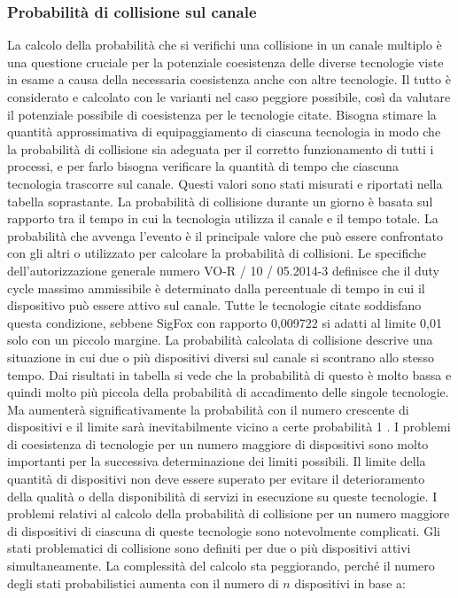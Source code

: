 \documentclass[a4paper]{report} %
\begin{document}
\subsubsection{Probabilità di collisione sul canale}
La calcolo della probabilità che si verifichi una collisione in un canale multiplo è una questione cruciale per la potenziale coesistenza delle diverse tecnologie viste in esame a causa della necessaria coesistenza anche con altre tecnologie. Il tutto è considerato e calcolato con le varianti nel caso peggiore possibile, così da valutare il potenziale possibile di coesistenza per le tecnologie citate. Bisogna stimare la quantità approssimativa di equipaggiamento di ciascuna tecnologia in modo che la probabilità di collisione sia adeguata per il corretto funzionamento di tutti i processi, e per farlo bisogna verificare la quantità di tempo che ciascuna tecnologia trascorre sul canale. Questi valori sono stati misurati e riportati nella tabella soprastante. La probabilità di collisione durante un giorno è basata sul rapporto tra il tempo in cui la tecnologia utilizza il canale e il tempo totale. La probabilità che avvenga l'evento è il principale valore che può essere confrontato con gli altri o utilizzato per calcolare la probabilità di collisioni. Le specifiche dell'autorizzazione generale numero VO-R / 10 / 05.2014-3  definisce che il duty cycle massimo ammissibile è determinato dalla percentuale di tempo in cui il dispositivo può essere attivo sul canale. Tutte le tecnologie citate soddisfano questa condizione, sebbene SigFox con rapporto 0,009722 si adatti al limite 0,01 solo con un piccolo margine. La probabilità calcolata di collisione descrive una situazione in cui due o più dispositivi diversi sul canale si scontrano allo stesso tempo. Dai risultati in tabella si vede che la probabilità di questo è molto bassa e quindi molto più piccola della probabilità di accadimento delle singole tecnologie. Ma aumenterà significativamente la probabilità con il numero crescente di dispositivi e il limite sarà inevitabilmente vicino a certe probabilità 1 \cite{art:rif.46}.
I problemi di coesistenza di tecnologie per un numero maggiore di dispositivi sono molto importanti per la successiva determinazione dei limiti possibili. Il limite della quantità di dispositivi non deve essere superato per evitare il deterioramento della qualità o della disponibilità di servizi in esecuzione su queste tecnologie. I problemi relativi al calcolo della probabilità di collisione per un numero maggiore di dispositivi di ciascuna di queste tecnologie sono notevolmente complicati. Gli stati problematici di collisione sono definiti per due o più dispositivi attivi simultaneamente. La complessità del calcolo sta peggiorando, perché il numero degli stati probabilistici aumenta con il numero di $n$ dispositivi in base a:
\end{document}
